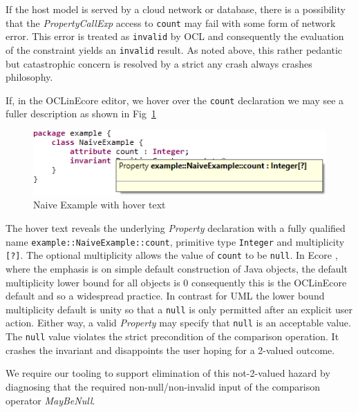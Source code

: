 \documentclass{llncs}
\begin{document}
If the host model is served by a cloud network or database, there is a possibility that the \emph{PropertyCallExp} access to \verb|count| may fail with some form of network error. This error is treated as \verb|invalid| by OCL and consequently the evaluation of the constraint yields an \verb|invalid| result. As noted above, this rather pedantic but catastrophic concern is resolved by a strict any crash always crashes philosophy.

If, in the OCLinEcore editor, we hover over the \verb|count| declaration we may see a fuller description as shown in Fig~\ref{fig:NaiveExampleWithHovertext}

\begin{figure}
	\vspace{-10pt}
	\begin{center}
		\includegraphics[width=4.5in]{NaiveExampleWithHovertext.png}
	\end{center}
	\vspace{-10pt}
	\caption{Naive Example with hover text}
	\label{fig:NaiveExampleWithHovertext}
	\vspace{-10pt}
\end{figure}

The hover text reveals the underlying \emph{Property} declaration with a fully qualified name \verb|example::NaiveExample::count|, primitive type \verb|Integer| and multiplicity \verb|[?]|. The optional multiplicity allows the value of \verb|count| to be \verb|null|. In Ecore \cite{Ecore}, where the emphasis is on simple default construction of Java objects, the default multiplicity lower bound for all objects is 0 consequently this is the OCLinEcore default and so a widespread practice. In contrast for UML the lower bound multiplicity default is unity so that a \verb|null| is only permitted after an explicit user action. Either way, a valid \emph{Property} may specify that \verb|null| is an acceptable value. The \verb|null| value violates the strict precondition of the comparison operation. It crashes the invariant and disappoints the user hoping for a 2-valued outcome.

We require our tooling to support elimination of this not-2-valued hazard by diagnosing that the required non-null/non-invalid input of the comparison operator \emph{MayBeNull}.
\end{document}
